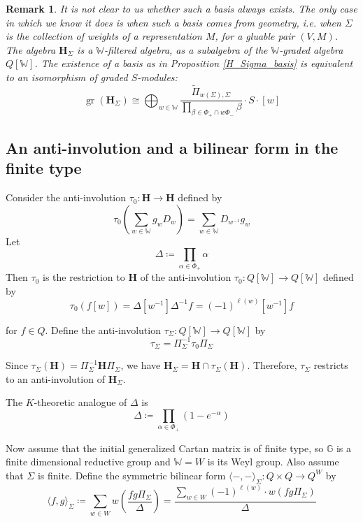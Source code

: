 \documentclass[11pt]{article}
\renewcommand{\H}{\textbf{H}}
\newcommand{\1}{\mathbb{1}}
\newcommand{\tW}{\mathbb{W}}
\newcommand{\tPi}{\widetilde{\Pi}}
\newtheorem{remark}[theorem]{Remark}
\theoremstyle{definition}
\numberwithin{equation}{section}
\begin{document}
\begin{remark}
    It is not clear to us whether such a basis always exists. The only case in which we know it does is when such a basis comes from geometry, i.e. when $\Sigma$ is the collection of weights of a representation $M$, for a gluable pair $(V,M)$. \\
    The algebra $\H_\Sigma$ is a $\tW$-filtered algebra, as a subalgebra of the $\tW$-graded algebra $Q[\tW]$. The existence of a basis as in Proposition \ref{H_Sigma_basis} is equivalent to an isomorphism of graded $S$-modules:
    $$\operatorname{gr}(\H_\Sigma) \cong \bigoplus_{w\in \tW} \frac{\tPi_{w(\Sigma),\Sigma}}{\prod_{\beta \in \mathbb{\Phi}_+ \cap w \mathbb{\Phi}_-} \beta} \cdot S \cdot [w]$$
\end{remark}

\subsection*{An anti-involution and a bilinear form in the finite type}

Consider the anti-involution $\tau_0 : \H \rightarrow \H$ defined by 
$$\tau_0\left(\sum_{w\in \tW} g_w D_w\right) = \sum_{w\in \tW} D_{w^{-1}} g_w$$
Let
$$\Delta \coloneqq \prod_{\alpha \in \mathbb{\Phi}_+} \alpha$$
Then $\tau_0$ is the restriction to $\H$ of the anti-involution $\tau_0 : Q[\tW]\rightarrow Q[\tW]$ defined by 
$$\tau_0(f[w]) = \Delta [w^{-1}] \Delta^{-1} f= (-1)^{\ell(w)} [w^{-1}] f$$

\noindent for $f\in Q$. Define the anti-involution 
$\tau_\Sigma : Q[\tW] \rightarrow Q[\tW]$ by $$\tau_\Sigma = \Pi_\Sigma^{-1} \tau_0 \Pi_\Sigma$$

Since $\tau_\Sigma(\H) = \Pi_\Sigma^{-1} \H \Pi_\Sigma$, we have $\H_\Sigma = \H \cap \tau_{\Sigma}(\H)$. Therefore, $\tau_\Sigma$ restricts to an anti-involution of $\H_\Sigma$.

\noindent The $K$-theoretic analogue of $\Delta$ is
$$\varDelta \coloneqq \prod_{{\alpha \in \mathbb{\Phi}_+}} (1-e^{-\alpha})$$

Now assume that the initial generalized Cartan matrix is of finite type, so $\mathbb{G}$ is a finite dimensional reductive group and $\tW=W$ is its Weyl group. Also assume that $\Sigma$ is finite. Define the symmetric bilinear form $\langle - , -\rangle_\Sigma : Q \times Q \rightarrow Q^W$ by
$$\langle f,g\rangle_\Sigma \coloneqq \sum_{w\in W} w\left( \frac{fg\Pi_\Sigma}{\Delta}\right) = \frac{\sum_{w\in W}(-1)^{\ell(w)} \cdot w(fg\Pi_\Sigma)}{\Delta}$$
\end{document}
